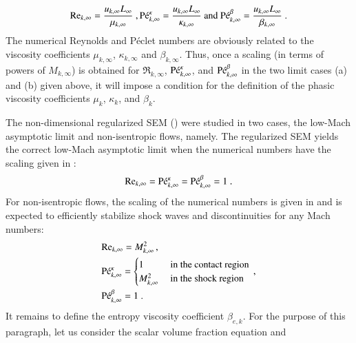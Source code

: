 \documentclass[preprint,10pt]{elsarticle}
\begin{document}
\begin{enumerate}
%
\begin{equation}
\label{eq:ref_numb}
\Re_{k,\infty} = \frac{u_{k,\infty} L_\infty}{\mu_{k,\infty}} \ ,
\Pe_{k,\infty}^\kappa = \frac{u_{k,\infty} L_\infty}{\kappa_{k,\infty}} \text{ and }
\Pe_{k,\infty}^\beta = \frac{u_{k,\infty} L_\infty}{\beta_{k,\infty}} \ .
\end{equation}
%
The numerical Reynolds and P\'eclet numbers are obviously related to the 
viscosity coefficients $\mu_{k,\infty}$, $\kappa_{k,\infty}$ and $\beta_{k,\infty}$. Thus, once a scaling (in terms of powers of $M_{k,\infty}$) 
is obtained for $\Re_{k,\infty}$, $\textrm{P\'e}_{k,\infty}^\kappa$, and $\textrm{P\'e}_{k,\infty}^\beta$ in the two limit cases (a) and (b) given above, it will 
impose a condition for the definition of the phasic viscosity coefficients $\mu_k$, $\kappa_k$, and $\beta_k$. 
\end{enumerate} 
The non-dimensional regularized SEM (\cite{Marco_paper_sem}) were studied in two cases, the low-Mach asymptotic limit and non-isentropic flows, namely. The regularized 
SEM yields the correct 
low-Mach asymptotic limit when the numerical numbers have the scaling given in :
%
\begin{equation}\label{eq:isent-flow-num-nb}
\Re_{k,\infty} = \Pe_{k,\infty}^\kappa = \Pe_{k,\infty}^\beta =1 \ .
\end{equation}
%
For non-isentropic flows, the scaling of the numerical numbers is given in  and is expected to efficiently stabilize shock waves 
and discontinuities for any Mach numbers:
%
\begin{align}\label{eq:non-isent-flow-num-nb}
&\textrm{Re}_{k,\infty} = M_{k,\infty}^2 \,, \nonumber \\ 
& \textrm{P\'e}_{k,\infty}^\kappa = 
\begin{cases} 
1              & \text{ in the contact region} \\
M^2_{k,\infty} & \text{ in the shock region } 
\end{cases} \,, \\ 
&\textrm{P\'e}_{k,\infty}^\beta = 1 \ . \nonumber
\end{align}
 
%
It remains to define the entropy viscosity coefficient $\beta_{e,k}$. For the purpose of this paragraph, let us consider the scalar volume fraction equation and 
\end{document}
